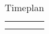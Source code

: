 \begin{table}[]
    \centering
    \begin{tabular}{c|c}
         &  \\
         & 
    \end{tabular}
    \caption{Timeplan}
    \label{tab:timeplan}
\end{table}